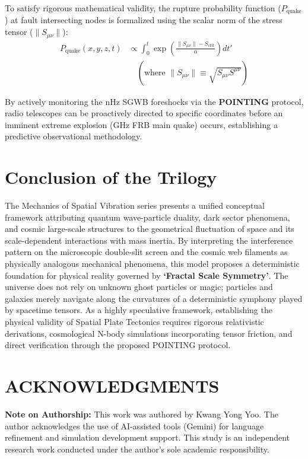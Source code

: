 \documentclass[reprint,amsmath,amssymb,aps,prd]{revtex4-2}
\begin{document}
To satisfy rigorous mathematical validity, the rupture probability function ($P_{\mathrm{quake}}$) at fault intersecting nodes is formalized using the scalar norm of the stress tensor ($\| S_{\mu\nu} \|$):
\begin{equation}
\begin{split}
P_{\mathrm{quake}}(x,y,z, t) &\propto \int_{0}^{t} \exp\left( \frac{\| S_{\mu\nu} \| - S_{\mathrm{crit}}}{\alpha} \right) dt' \\
&\quad \left( \text{where } \| S_{\mu\nu} \| \equiv \sqrt{S_{\mu\nu} S^{\mu\nu}} \right)
\end{split}
\end{equation}

By actively monitoring the nHz SGWB foreshocks via the \textbf{POINTING} protocol, radio telescopes can be proactively directed to specific coordinates before an imminent extreme explosion (GHz FRB main quake) occurs, establishing a predictive observational methodology.

\section{Conclusion of the Trilogy}
The Mechanics of Spatial Vibration series presents a unified conceptual framework attributing quantum wave-particle duality, dark sector phenomena, and cosmic large-scale structures to the geometrical fluctuation of space and its scale-dependent interactions with mass inertia.
By interpreting the interference pattern on the microscopic double-slit screen and the cosmic web filaments as physically analogous mechanical phenomena, this model proposes a deterministic foundation for physical reality governed by \textbf{`Fractal Scale Symmetry'}.
The universe does not rely on unknown ghost particles or magic;
particles and galaxies merely navigate along the curvatures of a deterministic symphony played by spacetime tensors.
As a highly speculative framework, establishing the physical validity of Spatial Plate Tectonics requires rigorous relativistic derivations, cosmological N-body simulations incorporating tensor friction, and direct verification through the proposed POINTING protocol.

\vspace{1em}
\section*{ACKNOWLEDGMENTS}
\textbf{Note on Authorship:} This work was authored by Kwang Yong Yoo. The author acknowledges the use of AI-assisted tools (Gemini) for language refinement and simulation development support. This study is an independent research work conducted under the author's sole academic responsibility.
\end{document}

